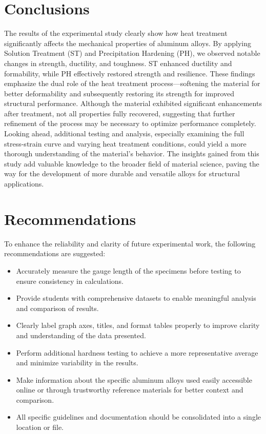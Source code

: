 \documentclass{article}
\begin{document}
{    \newpage\vspace*{-30pt}
    \section{Conclusions}
    
    The results of the experimental study clearly show how heat treatment significantly affects the mechanical properties of aluminum alloys. By applying Solution Treatment (ST) and Precipitation Hardening (PH), we observed notable changes in strength, ductility, and toughness. ST enhanced ductility and formability, while PH effectively restored strength and resilience. These findings emphasize the dual role of the heat treatment process—softening the material for better deformability and subsequently restoring its strength for improved structural performance. Although the material exhibited significant enhancements after treatment, not all properties fully recovered, suggesting that further refinement of the process may be necessary to optimize performance completely.\\[8pt]    
    Looking ahead, additional testing and analysis, especially examining the full stress-strain curve and varying heat treatment conditions, could yield a more thorough understanding of the material's behavior. The insights gained from this study add valuable knowledge to the broader field of material science, paving the way for the development of more durable and versatile alloys for structural applications.
    
    \newpage\vspace*{-30pt}
    \section{Recommendations}  
    To enhance the reliability and clarity of future experimental work, the following recommendations are suggested:  
    \begin{itemize}  
        \item Accurately measure the gauge length of the specimens before testing to ensure consistency in calculations.  
        \item Provide students with comprehensive datasets to enable meaningful analysis and comparison of results.  
        \item Clearly label graph axes, titles, and format tables properly to improve clarity and understanding of the data presented.  
        \item Perform additional hardness testing to achieve a more representative average and minimize variability in the results.  
        \item Make information about the specific aluminum alloys used easily accessible online or through trustworthy reference materials for better context and comparison.  
        \item All specific guidelines and documentation should be consolidated into a single location or file.
    \end{itemize}      
    
}
\end{document}
